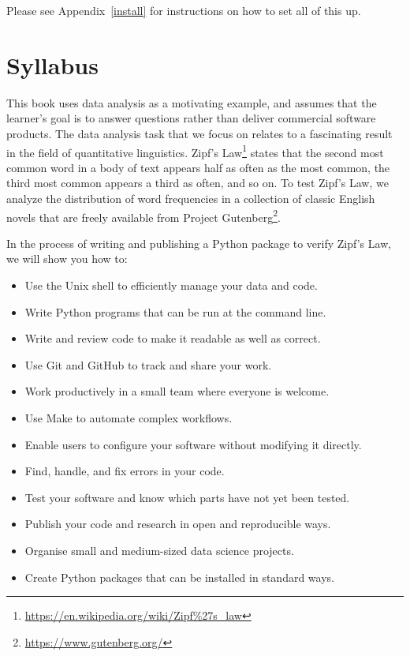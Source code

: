 \documentclass[
]{krantz}
\providecommand{\tightlist}{%
  \setlength{\itemsep}{0pt}\setlength{\parskip}{0pt}}
\renewcommand{\href}[2]{#2\footnote{\url{#1}}}
\begin{document}
Please see Appendix~\ref{install} for instructions on how to set all of this up.

\hypertarget{intro-syllabus}{%
\section{Syllabus}\label{intro-syllabus}}

This book uses data analysis as a motivating example,
and assumes that the learner's goal is to answer questions
rather than deliver commercial software products.
The data analysis task that we focus on
relates to a fascinating result in the field of quantitative linguistics.
\href{https://en.wikipedia.org/wiki/Zipf\%27s_law}{Zipf's Law} states that the second most common word in a body of text
appears half as often as the most common,
the third most common appears a third as often, and so on.
To test Zipf's Law,
we analyze the distribution of word frequencies
in a collection of classic English novels
that are freely available from \href{https://www.gutenberg.org/}{Project Gutenberg}.

In the process of writing and publishing a Python package to verify Zipf's Law,
we will show you how to:

\begin{itemize}
\tightlist
\item
  Use the Unix shell to efficiently manage your data and code.
\item
  Write Python programs that can be run at the command line.
\item
  Write and review code to make it readable as well as correct.
\item
  Use Git and GitHub to track and share your work.
\item
  Work productively in a small team where everyone is welcome.
\item
  Use Make to automate complex workflows.
\item
  Enable users to configure your software without modifying it directly.
\item
  Find, handle, and fix errors in your code.
\item
  Test your software and know which parts have not yet been tested.
\item
  Publish your code and research in open and reproducible ways.
\item
  Organise small and medium-sized data science projects.
\item
  Create Python packages that can be installed in standard ways.
\end{itemize}
\end{document}
